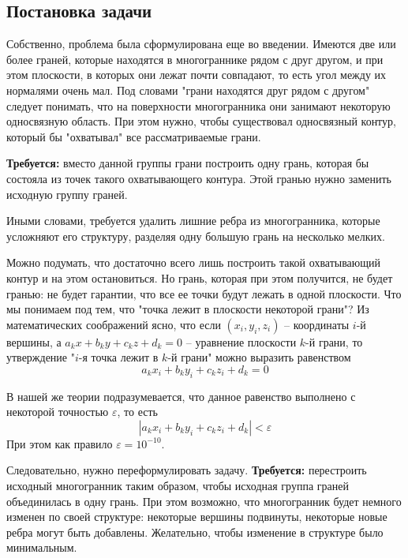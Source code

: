 \documentclass[a4paper,12pt, titlepage]{article}
\begin{document}
\subsection{Постановка задачи}
\begin{flushleft}
  Собственно, проблема была сформулирована еще во введении. Имеются две или более граней, которые находятся
в многограннике рядом с друг другом, и при этом плоскости, в которых они лежат почти совпадают, то есть угол
между их нормалями очень мал. Под словами "грани находятся друг рядом с другом" следует понимать, что на 
поверхности многогранника они занимают некоторую односвязную область. При этом нужно, чтобы существовал 
односвязный контур, который бы "охватывал" все рассматриваемые грани.
\end{flushleft}
\begin{flushleft}
 \textbf{Требуется:} вместо данной группы грани построить одну грань, которая бы состояла из точек такого 
охватывающего контура. Этой гранью нужно заменить исходную группу граней.
\end{flushleft}
\begin{flushleft}
  Иными словами, требуется удалить лишние ребра из многогранника, которые усложняют его структуру, 
разделяя одну большую грань на несколько мелких.
\end{flushleft}
\begin{flushleft}
 Можно подумать, что достаточно всего лишь построить такой охватывающий контур и на этом остановиться. Но грань, 
которая при этом получится, не будет гранью: не будет гарантии, что все ее точки будут лежать в одной плоскости.
Что мы понимаем под тем, что "точка лежит в плоскости некоторой грани"? Из математических соображений ясно, что
если $(x_{i}, y_{i}, z_{i})$ -- координаты $i$-й вершины, а $a_{k} x + b_{k} y + c_{k} z + d_{k} = 0$ -- 
уравнение плоскости $k$-й грани, то утверждение "$i$-я точка лежит в $k$-й грани" можно выразить равенством
$$
  a_{k} x_{i} + b_{k} y_{i} + c_{k} z_{i} + d_{k} = 0
$$
\end{flushleft}
\begin{flushleft}
 В нашей же теории подразумевается, что данное равенство выполнено с некоторой точностью $\varepsilon$, 
то есть
$$
  |a_{k} x_{i} + b_{k} y_{i} + c_{k} z_{i} + d_{k}| < \varepsilon
$$
При этом как правило $\varepsilon = 10^{-10}$.
\end{flushleft}
\begin{flushleft}
 Следовательно, нужно переформулировать задачу. \textbf{Требуется: } перестроить исходный многогранник таким
образом, чтобы исходная группа граней объединилась в одну грань. При этом возможно, что многогранник будет
немного изменен по своей структуре: некоторые вершины подвинуты, некоторые новые ребра могут быть добавлены.
Желательно, чтобы изменение в структуре было минимальным.
\end{flushleft}
\end{document}
